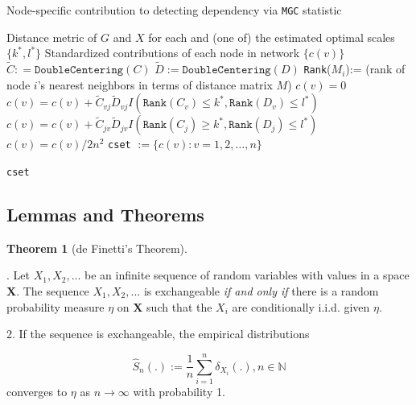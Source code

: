 \documentclass[12pt]{article}
\theoremstyle{definition}
\newtheorem{theorem}{Theorem}[section]
\begin{document}
\begin{algorithm}[H]
	\caption{Node-specific contribution to detecting dependency via \texttt{MGC} statistic}
	\begin{algorithmic}[1]
		\Require Distance metric of $G$ and $X$ for each and (one of) the estimated optimal scales $\{ k^{*}, l^{*} \}$ 
		\Ensure  Standardized contributions of each node in network $\{  c(v) \}$
		\State $\tilde{C} : = \texttt{DoubleCentering}(C)$
		\State $\tilde{D} := \texttt{DoubleCentering}(D)$
		\State \texttt{Rank}($M_{i}$):= (rank of node $i$'s nearest neighbors in terms of distance matrix $M$)
		\State $c(v) = 0$
		\Begin
		\State $c(v) =  c(v) + \tilde{C}_{vj} \tilde{D}_{v j} I(  \texttt{Rank}(C_{v})  \leq k^{*}, \texttt{Rank}(D_{v}) \leq l^{*} )$
		\State  $c(v) = c(v) + \tilde{C}_{jv} \tilde{D}_{jv} I(  \texttt{Rank}(C_{j}) \geq k^{*}, \texttt{Rank}(D_{j}) \leq l^{*} )$
		\End
		\EndFor
		\State $c(v) = c(v) / 2 n^2$
		\EndFor
		\State \texttt{cset} $:= \{ c(v) : v = 1,2, \ldots ,n  \}$
		
		\Return  \texttt{cset}
		\EndFunction
	\end{algorithmic}
\end{algorithm}

\newpage
\subsection{Lemmas and Theorems}
	
\begin{theorem}[de Finetti's Theorem] 
	\label{finetti}
	
. Let $X_{1}, X_{2}, ...$ be an infinite sequence of random variables with values in a space $\mathbf{X}$. The sequence $X_{1}, X_{2}, ...$ is exchangeable \textit{if and only if} there is a random probability measure $\eta$ on $\mathbf{X}$ such that the $X_{i}$ are conditionally i.i.d. given $\eta$. 
		
2. If the sequence is exchangeable, the empirical distributions
		
$$\hat{S}_{n} ( . ) := \frac{1}{n} \sum\limits_{i=1}^{n} \delta_{X_{i}} ( .), n \in \mathbb{N}$$
		converges to $\eta$ as $n \rightarrow \infty$ with probability 1.
\end{theorem}
	
\end{document}
